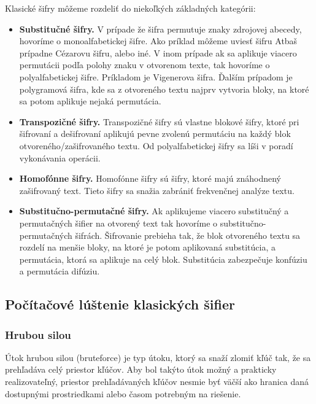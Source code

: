 Klasické šifry môžeme rozdeliť do niekoľkých základných kategórii:
\begin{itemize}

\item \textbf{Substitučné šifry.}
  V prípade že šifra permutuje znaky zdrojovej abecedy, hovoríme o monoalfabetickej šifre.
  Ako príklad môžeme uviesť šifru Atbaš prípadne Cézarovu šifru, alebo iné.
  V inom prípade ak sa aplikuje viacero permutácii podľa polohy znaku v otvorenom texte, tak hovoríme o polyalfabetickej šifre.
  Príkladom je Vigenerova šifra. Ďalším prípadom je polygramová šifra, kde sa z otvoreného textu najprv vytvoria bloky,
  na ktoré sa potom aplikuje nejaká permutácia.

\item \textbf{Transpozičné šifry.}
  Transpozičné šifry sú vlastne blokové šifry, ktoré pri šifrovaní a dešifrovaní aplikujú pevne zvolenú permutáciu na každý blok
  otvoreného/zašifrovaného textu. Od polyalfabetickej šifry sa líši v poradí vykonávania operácii.
  
\item \textbf{Homofónne šifry.}
  Homofónne šifry sú šifry, ktoré majú znáhodnený zašifrovaný text. Tieto šifry sa snažia zabrániť frekvenčnej analýze textu. 
  
\item \textbf{Substitučno-permutačné šifry.}
  Ak aplikujeme viacero substitučný a permutačných šifier na otvorený text tak hovoríme o substitučno-permutačných šifrách.
  Šifrovanie prebieha tak, že blok otvoreného textu sa rozdelí na menšie bloky, na ktoré je potom aplikovaná substitúcia, a permutácia,
  ktorá sa aplikuje na celý blok. Substitúcia zabezpečuje konfúziu a permutácia difúziu.
  
\end{itemize}

\subsection{Počítačové lúštenie klasických šifier}

\subsubsection{Hrubou silou}
Útok hrubou silou (bruteforce) je typ útoku, ktorý sa snaží zlomiť kľúč tak, že sa prehľadáva celý priestor kľúčov.
Aby bol takýto útok možný a prakticky realizovateľný, priestor prehľadávaných kľúčov nesmie byť väčší ako hranica daná dostupnými
prostriedkami alebo časom potrebným na riešenie.

